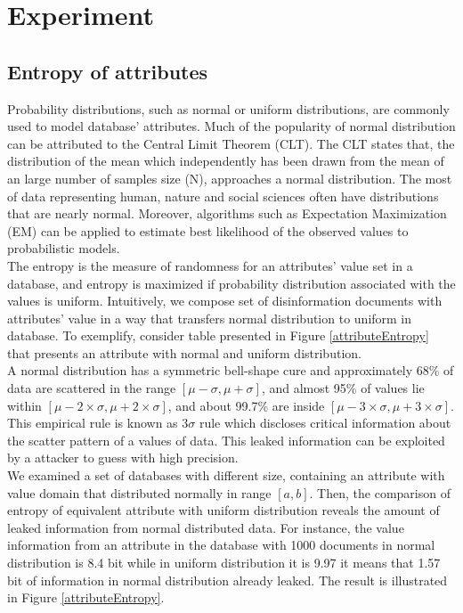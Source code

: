 \section{Experiment}
\subsection{Entropy of attributes}
Probability distributions, such as normal or uniform distributions, are commonly used to model database' attributes. Much of the popularity of normal distribution can be attributed to the Central Limit Theorem (CLT). The CLT states that, the distribution of the mean which independently has been drawn from the mean of an large number of samples size (N), approaches a normal distribution. The most of data representing human, nature and social sciences often have distributions that are nearly normal. Moreover, algorithms such as Expectation Maximization (EM) can be applied to estimate best likelihood of the observed values to probabilistic models.\\

The entropy is the measure of randomness for an attributes' value set in a database, and entropy is maximized if probability distribution associated with the values is uniform. Intuitively, we compose set of disinformation documents with attributes' value in a way that transfers normal distribution to uniform in database. To exemplify, consider table presented in Figure \ref{attributeEntropy} that presents an attribute with normal and uniform distribution.\\

A normal distribution has a symmetric bell-shape cure and approximately 68\% of data are scattered in the range $[\mu - \sigma, \mu + \sigma]$, and almost 95\% of values lie within $[\mu - 2 \times\sigma, \mu + 2 \times \sigma]$, and about 99.7\% are inside  $[\mu - 3 \times\sigma, \mu + 3 \times \sigma]$. This empirical rule is known as $3\sigma$ rule which discloses critical information about the scatter pattern of a values of data. This leaked information can be exploited by a attacker to guess with high precision.\\ 

We examined a set of databases with different size, containing an attribute with value domain that distributed normally in range $[a,b]$. Then, the comparison of entropy of equivalent attribute with uniform distribution reveals the amount of leaked information from normal distributed data. For instance, the value information from an attribute in the database with 1000 documents in normal distribution is 8.4 bit while in uniform distribution it is 9.97 it means that 1.57 bit of information in normal distribution already leaked. The result is illustrated in Figure \ref{attributeEntropy}. 


